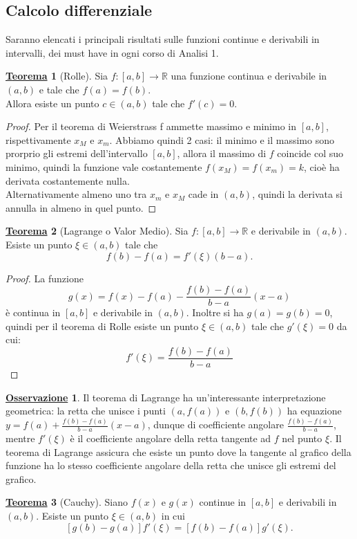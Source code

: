 \documentclass[a4paper,twoside]{article}
\newcommand{\R}{\mathbb{R}}
\theoremstyle{definition}
\newtheorem{theorem}{\color{Red}\underline{\textrm Teorema}}
\newtheorem{oss}{\underline{\textrm Osservazione}}
\numberwithin{theorem}{section}
\begin{document}
\subsection{Calcolo differenziale}
Saranno elencati i principali risultati sulle funzioni continue e derivabili in intervalli, dei must have in ogni corso di Analisi 1.
\begin{theorem}[Rolle]
Sia $f:[a,b]\to\R$ una funzione continua e derivabile in $(a,b)$ e tale che $f(a)=f(b)$.\\ Allora esiste un punto $c\in(a,b)$ tale che $f'(c)=0$.   
\end{theorem}
\begin{proof}
    Per il teorema di Weierstrass f ammette massimo e minimo in $[a,b]$, rispettivamente $x_M$ e $x_m$. Abbiamo quindi 2 casi:
    il minimo e il massimo sono prorprio gli estremi dell'intervallo $[a,b]$, allora il massimo di $f$ coincide col suo minimo, quindi la funzione vale costantemente $f(x_M)=f(x_m)=k$, cioè ha derivata costantemente nulla. \\
    Alternativamente almeno uno tra $x_m$ e $x_M$ cade in $(a,b)$, quindi la derivata si annulla in almeno in quel punto.
\end{proof}
\begin{theorem}[Lagrange o Valor Medio]
Sia $f:[a,b]\to\R$ e derivabile in $(a,b)$. Esiste un punto $\xi\in(a,b)$ tale che $$f(b)-f(a)=f'(\xi)(b-a).$$
\end{theorem}
\begin{proof}
    La funzione $$g(x)=f(x)-f(a)-\frac{f(b)-f(a)}{b-a}(x-a)$$ è continua in $[a,b]$ e derivabile in $(a,b)$. Inoltre si ha $g(a)=g(b)=0$, quindi per il teorema di Rolle esiste un punto $\xi\in(a,b)$ tale che $g'(\xi)=0$ da cui: $$f'(\xi)=\frac{f(b)-f(a)}{b-a}$$
\end{proof}
\begin{oss}
    Il teorema di Lagrange ha un'interessante interpretazione geometrica: la retta che unisce i punti $(a,f(a))$ e $(b,f(b))$ ha equazione $y=f(a)+\frac{f(b)-f(a)}{b-a}(x-a)$, dunque di coefficiente angolare $\frac{f(b)-f(a)}{b-a}$, mentre $f'(\xi)$ è il coefficiente angolare della retta tangente ad $f$ nel punto $\xi$. Il teorema di Lagrange assicura che esiste un punto dove la tangente al grafico della funzione ha lo stesso coefficiente angolare della retta che unisce gli estremi del grafico.
\end{oss}
\begin{theorem}[Cauchy]
    Siano $f(x)$ e $g(x)$ continue in $[a,b]$ e derivabili in $(a,b)$. Esiste un punto $\xi\in(a,b)$ in cui
    $$[g(b)-g(a)]f'(\xi)=[f(b)-f(a)]g'(\xi).$$
\end{theorem}
\end{document}
